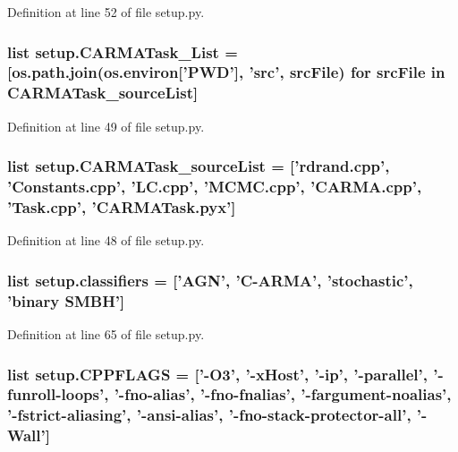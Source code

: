 Definition at line 52 of file setup.\-py.

\hypertarget{namespacesetup_aae98c7021359c0fe9ff337761d5c1dc5}{
\subsubsection[{C\-A\-R\-M\-A\-Task\-\_\-\-List}]{\setlength{\rightskip}{0pt plus 5cm}list setup.\-C\-A\-R\-M\-A\-Task\-\_\-\-List = \mbox{[}os.\-path.\-join(os.\-environ\mbox{[}'P\-W\-D'\mbox{]}, 'src', src\-File) for src\-File in {\bf C\-A\-R\-M\-A\-Task\-\_\-source\-List}\mbox{]}}}\label{namespacesetup_aae98c7021359c0fe9ff337761d5c1dc5}


Definition at line 49 of file setup.\-py.

\hypertarget{namespacesetup_a76df4fd83158e36d10a07aced7b11e8f}{
\subsubsection[{C\-A\-R\-M\-A\-Task\-\_\-source\-List}]{\setlength{\rightskip}{0pt plus 5cm}list setup.\-C\-A\-R\-M\-A\-Task\-\_\-source\-List = \mbox{[}'rdrand.\-cpp', 'Constants.\-cpp', 'L\-C.\-cpp', 'M\-C\-M\-C.\-cpp', 'C\-A\-R\-M\-A.\-cpp', 'Task.\-cpp', 'C\-A\-R\-M\-A\-Task.\-pyx'\mbox{]}}}\label{namespacesetup_a76df4fd83158e36d10a07aced7b11e8f}


Definition at line 48 of file setup.\-py.

\hypertarget{namespacesetup_a2d96dddd66b7833bbb2db38dbbe55a02}{
\subsubsection[{classifiers}]{\setlength{\rightskip}{0pt plus 5cm}list setup.\-classifiers = \mbox{[}'A\-G\-N', 'C-\/A\-R\-M\-A', 'stochastic', 'binary S\-M\-B\-H'\mbox{]}}}\label{namespacesetup_a2d96dddd66b7833bbb2db38dbbe55a02}


Definition at line 65 of file setup.\-py.

\hypertarget{namespacesetup_a94afbb2834cc36eb3a362aec00c4f0bb}{
\subsubsection[{C\-P\-P\-F\-L\-A\-G\-S}]{\setlength{\rightskip}{0pt plus 5cm}list setup.\-C\-P\-P\-F\-L\-A\-G\-S = \mbox{[}'-\/O3', '-\/x\-Host', '-\/ip', '-\/parallel', '-\/funroll-\/loops', '-\/fno-\/alias', '-\/fno-\/fnalias', '-\/fargument-\/noalias', '-\/fstrict-\/aliasing', '-\/ansi-\/alias', '-\/fno-\/stack-\/protector-\/all', '-\/Wall'\mbox{]}}}\label{namespacesetup_a94afbb2834cc36eb3a362aec00c4f0bb}


